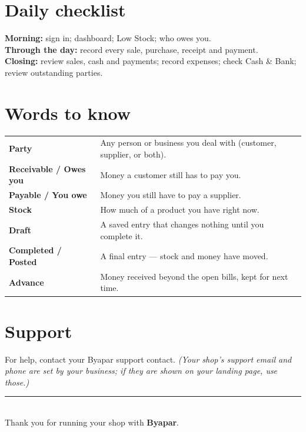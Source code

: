 \documentclass[11pt,a4paper,openany]{report}
\begin{document}
\section{Daily checklist}
\textbf{Morning:} sign in; dashboard; Low Stock; who owes you.\\
\textbf{Through the day:} record every sale, purchase, receipt and payment.\\
\textbf{Closing:} review sales, cash and payments; record expenses; check Cash \&
Bank; review outstanding parties.

\section{Words to know}
\begin{center}
\small
\begin{tabularx}{\linewidth}{>{\bfseries\color{navy}}l X}
\toprule
Party & Any person or business you deal with (customer, supplier, or both). \\
Receivable / Owes you & Money a customer still has to pay you. \\
Payable / You owe & Money you still have to pay a supplier. \\
Stock & How much of a product you have right now. \\
Draft & A saved entry that changes nothing until you complete it. \\
Completed / Posted & A final entry — stock and money have moved. \\
Advance & Money received beyond the open bills, kept for next time. \\
\bottomrule
\end{tabularx}
\end{center}

\section{Support}
For help, contact your Byapar support contact. \emph{(Your shop's support email and
phone are set by your business; if they are shown on your landing page, use those.)}

\vfill
\begin{center}
{\color{brandgreen}\rule{0.5\linewidth}{1pt}}\\[6pt]
{\sffamily\color{inkgray}\small Thank you for running your shop with \textbf{\color{navy}Byapar}.}
\end{center}
\end{document}

